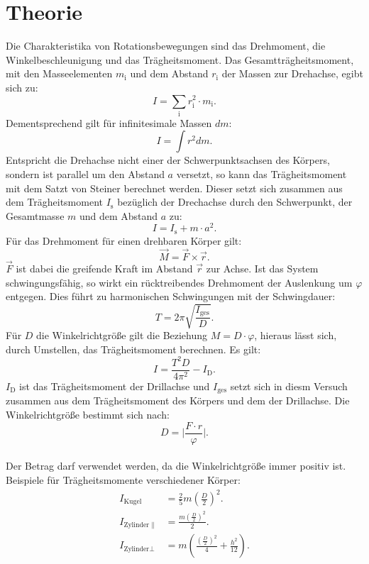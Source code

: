 \section{Theorie}
\label{sec:Theorie}

Die Charakteristika von Rotationsbewegungen sind das Drehmoment,
die Winkelbeschleunigung und das Trägheitsmoment.
Das Gesamtträgheitsmoment, mit den Masseelementen $m_{\mathrm{i}}$ und dem Abstand $r_{\mathrm{i}}$
der Massen zur Drehachse, egibt sich zu:
\begin{equation}
  I=\sum_{\mathrm{i}} r_{\mathrm{i}}^2\cdot m_{\mathrm{i}}.
\end{equation}
Dementsprechend gilt für infinitesimale Massen $dm$:
\begin{equation}
  I=\int r^2dm.
\end{equation}
Entspricht die Drehachse nicht einer der Schwerpunktsachsen des Körpers, sondern
ist parallel um den Abstand $a$ versetzt, so kann das Trägheitsmoment mit dem Satzt
von Steiner berechnet werden. Dieser setzt sich zusammen aus dem Trägheitsmoment $I_{\mathrm{s}}$
bezüglich der Drechachse durch den Schwerpunkt, der Gesamtmasse $m$ und dem Abstand $a$
zu:
\begin{equation}
  I=I_{\mathrm{s}}+m\cdot a^2.
\end{equation}
Für das Drehmoment für einen drehbaren Körper gilt:
\begin{equation}
 \vec{M}=\vec{F}\times\vec{r}.
\end{equation}
$\vec{F}$ ist dabei die greifende Kraft im Abstand $\vec{r}$ zur Achse.
Ist das System schwingungsfähig, so wirkt ein rücktreibendes Drehmoment
der Auslenkung um $\varphi$ entgegen. Dies führt zu harmonischen Schwingungen
mit der Schwingdauer:
\begin{equation}
  T=2\pi\sqrt{\frac{I_{\mathrm{{ges}}}}{D}}.
\end{equation}
Für $D$ die Winkelrichtgröße gilt die Beziehung $M=D\cdot\varphi$, hieraus lässt
sich, durch Umstellen, das Trägheitsmoment berechnen.
Es gilt:
\begin{equation}
 I=\frac{T^2 D}{4\pi^2}-I_{\mathrm{D}}.\label{eqn:I}
\end{equation}
$I_{\mathrm{D}}$ ist das Trägheitsmoment der Drillachse und $I_{\mathrm{ges}}$ setzt sich in diesm Versuch zusammen aus dem Trägheitsmoment des Körpers und dem der Drillachse.
Die Winkelrichtgröße bestimmt sich nach:
\begin{equation}
  D=\bigl|\frac{F\cdot r}{\varphi}\bigr|. \label{eqn:D}
\end{equation}\\
Der Betrag darf verwendet werden, da die Winkelrichtgröße immer positiv ist.
Beispiele für Trägheitsmomente verschiedener Körper:
\begin{align}
  I_{\mathrm{Kugel}}&=\frac{2}{5} m (\frac{D}{2})^2.\label{eqn:Kugel}\\
  I_{\mathrm{Zylinder\parallel}}&=\frac{m(\frac{D}{2})^2}{2}\label{eqn:zs}.\\
  I_{\mathrm{Zylinder\bot}}&=m\left(\frac{(\frac{D}{2})^2}{4}+\frac{h^2}{12}\right).\label{eqn:zl}
\end{align}
